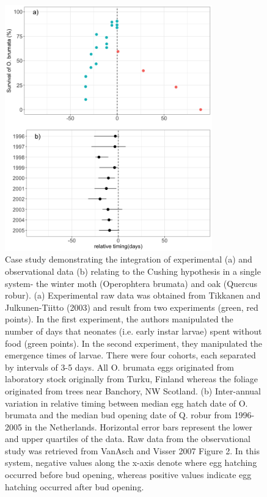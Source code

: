 \documentclass[11pt,letterpaper]{article}
\begin{document}
\begin{figure}[ht!]
\caption{Case study demonstrating the integration of experimental (a) and observational data (b) relating to the Cushing hypothesis in a single system- the winter moth (Operophtera brumata) and oak (Quercus robur). (a) Experimental raw data was obtained from Tikkanen and Julkunen-Tiitto (2003) and result from two experiments (green, red points). In the first experiment, the authors manipulated the number of days that neonates (i.e. early instar larvae) spent without food (green points). In the second experiment, they manipulated the emergence times of larvae. There were four cohorts, each separated by intervals of 3-5 days. All O. brumata eggs originated from laboratory stock originally from Turku, Finland whereas the foliage originated from trees near Banchory, NW Scotland. (b) Inter-annual variation in relative timing between median egg hatch date of O. brumata and the median bud opening date of Q. robur from 1996-2005 in the Netherlands. Horizontal error bars represent the lower and upper quartiles of the data. Raw data from the observational study was retrieved from VanAsch and Visser 2007 Figure 2. In this system, negative values along the x-axis denote where egg hatching occurred before bud opening, whereas positive values indicate egg hatching occurred after bud opening.}
\begin{center}
\includegraphics[width=0.8\textwidth]{fig3_v1.png}
\end{center}
\end{figure}
\clearpage


\end{document}
